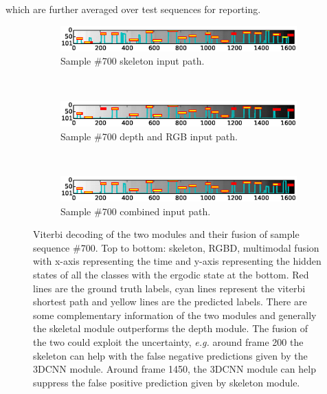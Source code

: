 which are further averaged over test sequences for reporting.


\begin{figure}[t]
        \centering
        \begin{subfigure}[c]{.8\textwidth}
                \includegraphics[width=\textwidth]{images/path/Sample0700_sk}
\vspace*{-3mm}
                \caption{Sample \#700 skeleton input path.}
                \label{Sample0700_sk}
        \end{subfigure}%
        ~ %

        \begin{subfigure}[c]{0.8\textwidth}
                \includegraphics[width=\textwidth]{images/path/Sample0700_cnn}
\vspace*{-3mm}
                \caption{Sample \#700 depth and RGB input path.}
                \label{Sample0700_cnn}
        \end{subfigure}

        ~ %
        \begin{subfigure}[c]{0.8\textwidth}
                \includegraphics[width=\textwidth]{images/path/Sample0700_combined}
\vspace*{-3mm}
                \caption{Sample \#700 combined input path.}
                \label{Sample0700_combined}
        \end{subfigure}

  \caption{Viterbi decoding of the two modules and their fusion of sample sequence \#700. Top to bottom: skeleton, RGBD, multimodal fusion with x-axis representing the time and y-axis representing the hidden states of all the classes with the ergodic state at the bottom. Red lines are the ground truth labels, cyan lines represent the viterbi shortest path and yellow lines are the predicted labels. There are some complementary information of the two modules and generally the skeletal module outperforms the depth module. The fusion of the two could exploit the uncertainty, \emph{e.g.} around frame 200 the skeleton can help with the false negative predictions given by the 3DCNN module. Around frame 1450, the 3DCNN module can help suppress the false positive prediction given by skeleton module.
  }\label{Sample0700_comparison}
\end{figure}

